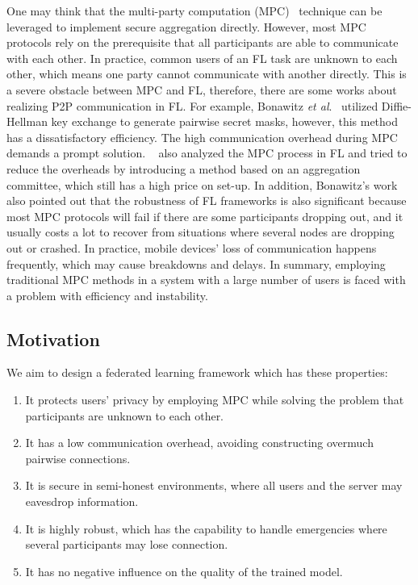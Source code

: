 One may think that the multi-party computation (MPC)~\cite{Yao} technique can be leveraged to implement secure aggregation directly. However, most MPC protocols rely on the prerequisite that all participants are able to communicate with each other. In practice, common users of an FL task are unknown to each other, which means one party cannot communicate with another directly. This is a severe obstacle between MPC and FL, therefore, there are some works about realizing P2P communication in FL. For example, Bonawitz \emph{et al}.~\cite{Practical} utilized Diffie-Hellman key exchange to generate pairwise secret masks, however, this method has a dissatisfactory efficiency. The high communication overhead during MPC demands a prompt solution. ~\cite{Two-Phase} also analyzed the MPC process in FL and tried to reduce the overheads by introducing a method based on an aggregation committee, which still has a high price on set-up. In addition, Bonawitz's work also pointed out that the robustness of FL frameworks is also significant because most MPC protocols will fail if there are some participants dropping out, and it usually costs a lot to recover from situations where several nodes are dropping out or crashed. In practice, mobile devices' loss of communication happens frequently, which may cause breakdowns and delays. In summary, employing traditional MPC methods in a system with a large number of users is faced with a problem with efficiency and instability.

\subsection{Motivation} We aim to design a federated learning framework which has these properties:
\begin{enumerate}
    \item It protects users' privacy by employing MPC while solving the problem that participants are unknown to each other.

    \item It has a low communication overhead, avoiding constructing overmuch pairwise connections.

    \item It is secure in semi-honest environments, where all users and the server may eavesdrop information.

    \item It is highly robust, which has the capability to handle emergencies where several participants may lose connection.

    \item It has no negative influence on the quality of the trained model.
\end{enumerate}

